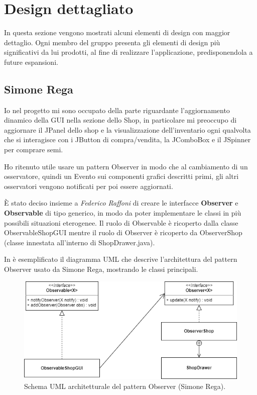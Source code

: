 \documentclass[a4paper,12pt]{report}
\begin{document}
\section{Design dettagliato}

In questa sezione vengono mostrati alcuni elementi di design con maggior dettaglio.
Ogni membro del gruppo presenta gli elementi di design più significativi da lui prodotti, al fine di realizzare l’applicazione, predisponendola a future espansioni.



\subsection{Simone Rega}
Io nel progetto mi sono occupato della parte riguardante l’aggiornamento dinamico della GUI nella sezione dello Shop, in particolare mi preoccupo di aggiornare il JPanel dello shop e la visualizzazione dell’inventario ogni qualvolta che si interagisce con i JButton di compra/vendita, la JComboBox e il JSpinner per comprare semi. 

Ho ritenuto utile usare un pattern Observer in modo che al cambiamento di un osservatore, quindi un Evento sui componenti grafici descritti primi, gli altri osservatori vengono notificati per poi essere aggiornati.


È stato deciso insieme a\textit{ Federico Raffoni} di creare le interfacce \textbf{Observer} e \textbf{Observable} di tipo generico, in modo da poter implementare le classi in più possibili situazioni eterogenee.
Il ruolo di Observable è ricoperto dalla classe ObservableShopGUI mentre il ruolo di Observer è ricoperto da ObserverShop (classe innestata all’interno di ShopDrawer.java). 

\hfill\break
In  è esemplificato il diagramma UML che descrive l'architettura del pattern Observer usato da Simone Rega, mostrando le classi principali.
\hfill\break

\begin{figure}[!htb]
	\centerline{\includegraphics[scale=0.8]{img/UML_ObserverSimo.png}}
	
	\caption{Schema UML architetturale del pattern Observer (Simone Rega).}
	\label{img:SimoneRega_Observer}
\end{figure}
\end{document}
